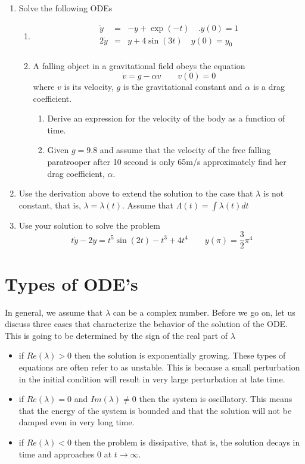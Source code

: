 \documentclass[12pt,legal]{article}
\begin{document}
\begin{enumerate}
\item Solve the following ODEs
\begin{enumerate}
\item
\begin{eqnarray*}
 \dot y &=& -y + \exp(-t) \quad. y(0) = 1 \\
2 \dot y &=& y + 4\sin(3t) \quad y(0) = y_0\\
\end{eqnarray*}

 \item A falling object in a gravitational field obeys the equation
 $$ \dot v = g - \alpha v \quad \quad v(0) = 0 $$
 where $v$ is its velocity, $g$ is the gravitational constant and $\alpha$ is a drag coefficient.
 \begin{enumerate}
 \item
 Derive an expression for the velocity of the body as a function of time.
 \item Given $g=9.8$ and assume that the velocity of the free falling paratrooper after 10 second is only 65m/s approximately find her drag coefficient, $\alpha$.
 \end{enumerate}
 
 \end{enumerate}
 \item Use the derivation above to extend the solution to the case that
$\lambda$ is not constant, that is, $\lambda = \lambda(t)$. Assume that $\Lambda(t) = \int \lambda(t) dt$

\item Use your solution to solve the problem
$$ t \dot y - 2y = t^5\sin(2t) - t^3 + 4t^4 \quad \quad  y(\pi) = \frac 32 \pi^4 $$
\end{enumerate}

\bigskip

\section{Types of ODE's}

In general, we assume that $\lambda$ can be a complex number. Before we go on, let us discuss three cases that characterize the behavior of the solution of the ODE. This is going to be determined by the sign of the real part of $\lambda$
\begin{itemize}
\item if $Re(\lambda) > 0$ then the solution is exponentially growing. These types of equations are often refer to as unstable. This is because a small perturbation in the initial condition will result in very large perturbation at late time.
\item if $Re(\lambda) = 0$ and $Im(\lambda)\not=0$ then the system is oscillatory.  
This means that the energy of the system is bounded and that the solution will not be damped even in very long time.
\item 
if $Re(\lambda) < 0$ then the problem is dissipative, that is, the solution decays in time and approaches $0$ at $t\rightarrow \infty$.
\end{itemize}
\end{document}
